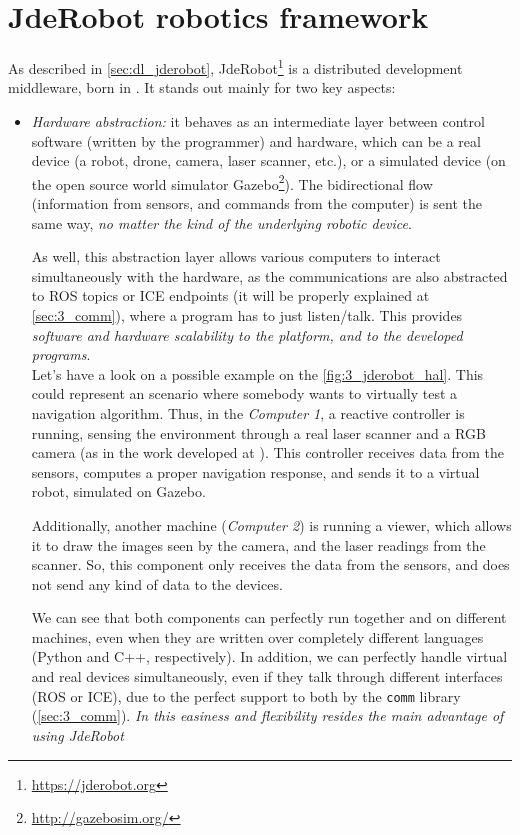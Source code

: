 \section{JdeRobot robotics framework}
	As described in \autoref{sec:dl_jderobot}, JdeRobot\footnote{\url{https://jderobot.org}} is a distributed development middleware, born in \cite{jmplaza-phd}. It stands out mainly for two key aspects:
	\begin{itemize}
		\item \textit{Hardware abstraction:} it behaves as an intermediate layer between control software (written by the programmer) and hardware, which can be a real device (a robot, drone, camera, laser scanner, etc.), or a simulated device (on the open source world simulator Gazebo\footnote{\url{http://gazebosim.org/}}). The bidirectional flow (information from sensors, and commands from the computer) is sent the same way, \textit{no matter the kind of the underlying robotic device}.
		
		As well, this abstraction layer allows various computers to interact simultaneously with the hardware, as the communications are also abstracted to ROS topics or ICE endpoints (it will be properly explained at \autoref{sec:3_comm}), where a program has to just listen/talk. This provides \textit{software and hardware scalability to the platform, and to the developed programs}.\\
		
		Let's have a look on a possible example on the \autoref{fig:3_jderobot_hal}. This could represent an scenario where somebody wants to virtually test a navigation algorithm. Thus, in the \emph{Computer 1}, a reactive controller is running, sensing the environment through a real laser scanner and a RGB camera (as in the work developed at \cite{rocapal}). This controller receives data from the sensors, computes a proper navigation response, and sends it to a virtual robot, simulated on Gazebo.
		
		Additionally, another machine (\emph{Computer 2}) is running a viewer, which allows it to draw the images seen by the camera, and the laser readings from the scanner. So, this component only receives the data from the sensors, and does not send any kind of data to the devices.
		
		We can see that both components can perfectly run together and on different machines, even when they are written over completely different languages (Python and C++, respectively). In addition, we can perfectly handle virtual and real devices simultaneously, even if they talk through different interfaces (ROS or ICE), due to the perfect support to both by the \texttt{comm}  library (\autoref{sec:3_comm}). 		 \textit{In this easiness and flexibility resides the main advantage of using JdeRobot}\\
		

\end{itemize}
